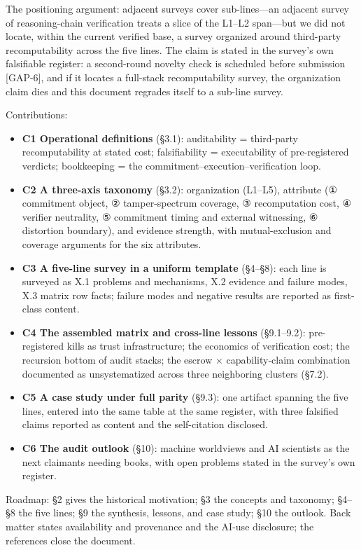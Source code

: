 \documentclass[11pt,a4paper]{article}
\begin{document}
The positioning argument: adjacent surveys cover sub-lines—an adjacent survey of reasoning-chain verification \cite{key14} treats a slice of the L1–L2 span—but we did not locate, within the current verified base, a survey organized around third-party recomputability across the five lines. The claim is stated in the survey's own falsifiable register: a second-round novelty check is scheduled before submission [GAP-6], and if it locates a full-stack recomputability survey, the organization claim dies and this document regrades itself to a sub-line survey.

Contributions:

\begin{itemize}[leftmargin=1.6em]
\item \textbf{C1 Operational definitions} (§3.1): auditability = third-party recomputability at stated cost; falsifiability = executability of pre-registered verdicts; bookkeeping = the commitment–execution–verification loop.
\item \textbf{C2 A three-axis taxonomy} (§3.2): organization (L1–L5), attribute (① commitment object, ② tamper-spectrum coverage, ③ recomputation cost, ④ verifier neutrality, ⑤ commitment timing and external witnessing, ⑥ distortion boundary), and evidence strength, with mutual-exclusion and coverage arguments for the six attributes.
\item \textbf{C3 A five-line survey in a uniform template} (§4–§8): each line is surveyed as X.1 problems and mechanisms, X.2 evidence and failure modes, X.3 matrix row facts; failure modes and negative results are reported as first-class content.
\item \textbf{C4 The assembled matrix and cross-line lessons} (§9.1–9.2): pre-registered kills as trust infrastructure; the economics of verification cost; the recursion bottom of audit stacks; the escrow × capability-claim combination documented as unsystematized across three neighboring clusters (§7.2).
\item \textbf{C5 A case study under full parity} (§9.3): one artifact spanning the five lines, entered into the same table at the same register, with three falsified claims reported as content and the self-citation disclosed.
\item \textbf{C6 The audit outlook} (§10): machine worldviews and AI scientists as the next claimants needing books, with open problems stated in the survey's own register.
\end{itemize}

Roadmap: §2 gives the historical motivation; §3 the concepts and taxonomy; §4–§8 the five lines; §9 the synthesis, lessons, and case study; §10 the outlook. Back matter states availability and provenance and the AI-use disclosure; the references close the document.
\end{document}
